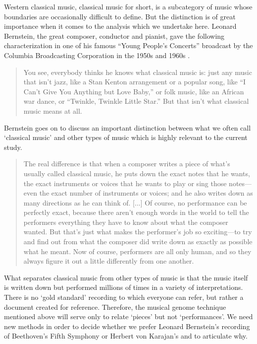 \documentclass[12pt]{article}
\begin{document}
Western classical music, classical music for short, is a subcategory
of music whose boundaries are occasionally difficult to define. But
the distinction is of great importance when it comes to the analysis
which we undertake here. Leonard Bernstein, the great composer,
conductor and pianist, gave the following characterization in one of his famous
``Young People's Concerts''
broadcast by the Columbia Broadcasting Corporation in the 1950s and
1960s \citep{Bernstein2005}.
\begin{quote}
  You see, everybody thinks he knows what classical music is: just any music that isn't jazz,
  like a Stan Kenton arrangement or a popular song, like ``I Can't Give
  You Anything but Love Baby,'' or folk music, like an African war
  dance, or ``Twinkle, Twinkle Little Star.'' But that isn't what
  classical music means at all.
\end{quote}
Bernstein goes on to discuss an important distinction between what
we often call `classical music' and other types of music which is
highly relevant to the current study.
\begin{quote}
  The real difference is that when a composer
  writes a piece of what's usually called classical music, he puts down
  the exact notes that he wants, the exact instruments or voices that he
  wants to play or sing those notes---even the exact number of
  instruments or voices; and he also writes down as many directions as
  he can think of. [...] Of course, no performance can be perfectly exact, because there
  aren't enough words in the world to tell the performers everything
  they have to know about what the composer wanted. But that's just what
  makes the performer's job so exciting---to try and find out from what
  the composer did write down as exactly as possible what he meant. Now
  of course, performers are all only human, and so they always figure it
  out a little differently from one another.  
\end{quote}
What separates classical music from other types of music is that the
music itself is written down but performed millions of times in a
variety of interpretations. There is no `gold standard' recording to
which everyone can refer, but rather a document created for
reference. Therefore, the musical genome technique mentioned above
will serve only to relate `pieces' but not `performances'. We need
new methods in order to decide whether we prefer Leonard Bernstein's
recording of Beethoven's Fifth Symphony or Herbert von Karajan's and
to articulate why.
\end{document}
